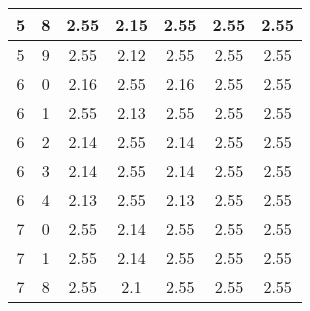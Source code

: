 \begin{longtable}{|c|c||c||c||c|c|c|}
	5 & 8 & 2.55 & 2.15 & 2.55 & 2.55 & 2.55 \\ \hline
	5 & 9 & 2.55 & 2.12 & 2.55 & 2.55 & 2.55 \\ \hline
	6 & 0 & 2.16 & 2.55 & 2.16 & 2.55 & 2.55 \\ \hline
	6 & 1 & 2.55 & 2.13 & 2.55 & 2.55 & 2.55 \\ \hline
	6 & 2 & 2.14 & 2.55 & 2.14 & 2.55 & 2.55 \\ \hline
	6 & 3 & 2.14 & 2.55 & 2.14 & 2.55 & 2.55 \\ \hline
	6 & 4 & 2.13 & 2.55 & 2.13 & 2.55 & 2.55 \\ \hline
	7 & 0 & 2.55 & 2.14 & 2.55 & 2.55 & 2.55 \\ \hline
	7 & 1 & 2.55 & 2.14 & 2.55 & 2.55 & 2.55 \\ \hline
	7 & 8 & 2.55 & 2.1 & 2.55 & 2.55 & 2.55 \\ \hline
\end{longtable}
\clearpage{}

